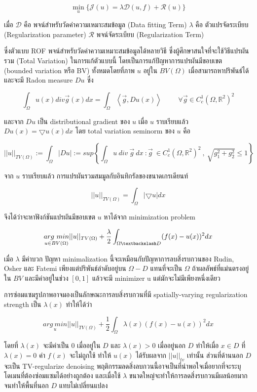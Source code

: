 \documentclass[hidelinks,a4paper,14pt]{article}
\numberwithin{equation}{section}							%
\begin{document}
{		$$\min_{u} \{ \mathcal{J}(u)= \lambda \mathcal{D}(u,f)+  \mathcal{R}(u) \}$$

		เมื่อ $\mathcal{D}$ คือ พจน์สำหรับวัดค่าความเหมาะสมข้อมูล (Data fitting Term) $\lambda$ คือ ตัวแปรจัดระเบียบ (Regularization parameter)  $\mathcal{R}$ พจน์จัดระเบียบ (Regularization Term) 
		
		ซึ่งตัวแบบ ROF พจน์สำหรับวัดค่าความเหมาะสมข้อมูลได้หลายวิธี ซึ่งผู้ศึกษาสนใจที่จะใช้วิธีแปรผันรวม (Total Variation) \cite{ref:splitbergman-denoise} ในการแก้ตัวแบบนี้	 โดยเป็นการแก้ปัญหาการแปรผันมีขอบเขต (bounded variation หรือ BV) ทั้งหมดโดยที่ภาพ $u$ อยู่ใน $BV(\Omega)$ เมื่อสามารถหาปริพันธ์ได้และจะมี Radon measure $Du$ ซึ่ง 
		
		$$\int_{\Omega}u(x) div \vec{g}(x) dx = \int_{\Omega} \left\langle\vec{g},Du(x) \right\rangle\hspace{1cm}\forall\vec{g} \in C_c^1(\Omega,\mathbb{R}^2)^2$$
		
		และจาก $Du$ เป็น distributional gradient ของ $u$ เมื่อ $u$ ราบเรียบแล้ว  $Du(x)= \bigtriangledown u(x)dx $
		โดย total variation seminorm ของ $u$ คือ 
		
		$$ ||u||_{TV(\Omega)} := \int_{\Omega} | Du | := sup{ \left \{ \int_{\Omega}  u \ div  \ \vec{g} \ dx \  : \vec{g} \  \in C_c^1(\Omega,\mathbb{R}^2)^2 \ , \ \sqrt{g_1^2+g_2^2} \leq 1 \right \} }  $$
		
		จาก $u$ ราบเรียบแล้ว การแปรผันรวมสมมูลกับอินทิกรัลของขนาดเกรเดียนท์ 
		
		$$ ||u||_{TV(\Omega)} = \int_{\Omega} | \bigtriangledown u | dx$$
		
		จึงได้ว่าจะหาฟังก์ชันแปรผันมีขอบเขต $u$ หาได้จาก minimization problem
		
		$$ \underset{u \in BV(\Omega)}{arg \ min} ||u||_{TV(\Omega)} + \frac{\lambda}{2} \int_{\Omega \textbackslash D} (f(x) - u(x))^2 dx$$
		
		เมื่อ $\lambda$ มีค่าบวก ปัญหา minimalization นี้จะเหมือนกับปัญหาการลบสิ่งรบกวนของ Rudin, Osher และ Fatemi เพียงแต่ปริพันธ์ลำดับอยู่บน $\Omega-D$  แทนที่จะเป็น $\Omega$ ถ้าผลลัพธ์ที่แม่นตรงอยู่ใน $BV$ และมีค่าอยู่ในช่วง $[0,1]$ แล้วจะมี minimizer u แต่มักจะไม่มีเพียงหนึ่งเดียว 
		
		การซ่อมแซมรูปภาพอาจมองเป็นลักษณะการลบสิ่งรบกวนที่มี spatially-varying regularization strength เป็น $\lambda(x)$ ทำให้ได้ว่า
		
		$$\underset{u}{{arg \ min}} ||u||_{TV(\Omega)} + \frac{1}{2} \int_{\Omega} \lambda(x)(f(x) - u(x))^2 dx$$
		
		โดยที่ $\lambda(x)$ จะมีค่าเป็น $0$ เมื่ออยู่ใน $D$ และ $\lambda(x)>0$ เมื่ออยู่นอก $D$  ทำให้เมื่อ $x \in D$ ที่ $\lambda(x)=0$ ค่า $f(x)$ จะไม่ถูกใช้ ทำให้ $u(x)$ ได้รับผลจาก $||u||_{tv}$ เท่านั้น ส่วนที่ด้านนอก $D$ จะเป็น TV-regularize denoising พฤติกรรมลดสิ่งลบกวนนี้อาจเป็นที่น่าพอใจเมื่อยากที่จะระบุโดเมนที่ต้องซ่อมแซมได้อย่างถูกต้อง และเมื่อใช้ $λ$ ขนาดใหญ่จะทำให้การลดสิ่งรบกวนมีผลน้อยมากจนทำให้พื้นที่นอก $D$  แทบไม่เปลี่ยนแปลง
		
}
\end{document}
